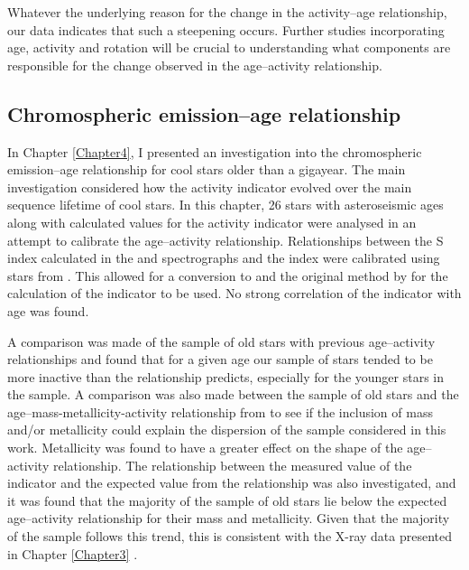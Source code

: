 Whatever the underlying reason for the change in the activity--age relationship, our data indicates that such a steepening occurs. Further studies incorporating age, activity and rotation will be crucial to understanding what components are responsible for the change observed in the age--activity relationship.

\subsection{Chromospheric emission--age relationship}

In Chapter \ref{Chapter4}, I presented an investigation into the chromospheric emission--age relationship for cool stars older than a gigayear. The main investigation considered how the \Rprime activity indicator evolved over the main sequence lifetime of cool stars. In this chapter, 26 stars with asteroseismic ages along with calculated values for the \Rprime activity indicator were analysed in an attempt to calibrate the age--activity relationship. Relationships between the S index calculated in the \esp and \narval spectrographs and the \Smw index were calibrated using stars from \cite{Duncan_etal_1991}. This allowed for a conversion to \Smw and the original method by \citet{Noyes_etal_1984} for the calculation of the \Rprime indicator to be used. No strong correlation of the \Rprime indicator with age was found.

A comparison was made of the sample of old stars with previous age--activity relationships and found that for a given age our sample of stars tended to be more inactive than the relationship predicts, especially for the younger stars in the sample. A comparison was also made between the sample of old stars and the age--mass-metallicity-activity relationship from \citet{Lorenzo_Oliveira_etal_2016} to see if the inclusion of mass and/or metallicity could explain the dispersion of the sample considered in this work. Metallicity was found to have a greater effect on the shape of the age--activity relationship. The relationship between the measured value of the \Rprime indicator and the expected value from the \citet{Lorenzo_Oliveira_etal_2016} relationship was also investigated, and it was found that the majority of the sample of old stars lie below the expected age--activity relationship for their mass and metallicity. Given that the majority of the sample follows this trend, this is consistent with the X-ray data presented in Chapter \ref{Chapter3} \citep{Booth_etal_2017}.

